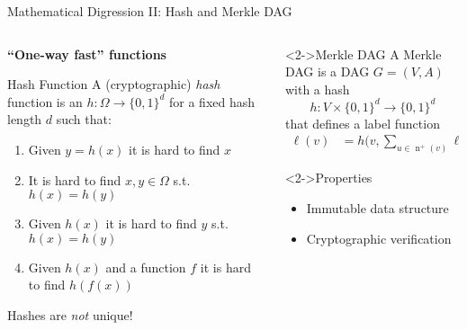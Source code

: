 \documentclass[xetex]{beamer}
\begin{document}
\begin{frame}{Mathematical Digression II: Hash and Merkle DAG}
  \begin{columns}
    \begin{column}{.5\linewidth}
      \textbf{``One-way fast'' functions}
      \begin{block}{Hash Function}
        A (cryptographic) \emph{hash} function is an $h : \Omega \to \{0,1\}^d$
        for a fixed hash length $d$ such that:
        \begin{enumerate}
          \item Given $y = h(x)$ it is hard to find $x$
          \item It is hard to find $x,y \in \Omega$ s.t. $h(x) = h(y)$
          \item Given $h(x)$ it is hard to find $y$ s.t. $h(x) = h(y)$
          \item Given $h(x)$ and a function $f$ it is hard to find $h(f(x))$
        \end{enumerate}
      \end{block}
      Hashes are \emph{not} unique!
    \end{column}
    \begin{column}{.5\linewidth}
      \begin{block}<2->{Merkle DAG}
        A Merkle DAG is a DAG $G = (V,A)$ with a hash
        \[
          h : V \times \{0,1\}^d \to \{0,1\}^d
        \]
        that defines a label function
        \begin{align*}
          \ell(v) &= h\biggl(v,
            \sum_{u \in \operatorname{n}^+(v)} \ell(u) \biggr)
        \end{align*}
      \end{block}
      \begin{alertblock}<2->{Properties}
        \begin{itemize}
          \item Immutable data structure
          \item Cryptographic verification
        \end{itemize}
      \end{alertblock}
    \end{column}
  \end{columns}
\end{frame}
\end{document}
